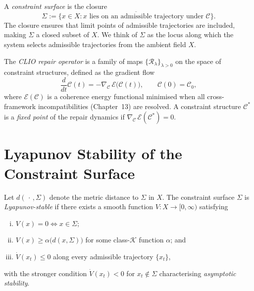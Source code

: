 \documentclass[11pt,openany]{book}
\begin{document}
\begin{definition}
\label{def:constraint-surface}
A \emph{constraint surface} is the closure
\[
  \Sigma := \overline{\bigl\{x \in X : x \text{ lies on an
    admissible trajectory under } \mathcal{C}\bigr\}}.
\]
The closure ensures that limit points of admissible
trajectories are included, making $\Sigma$ a closed subset
of $X$.  We think of $\Sigma$ as the locus along which the
system selects admissible trajectories from the ambient
field $X$.
\end{definition}

\begin{definition}
\label{def:clio}
The \emph{CLIO repair operator} is a family of maps
$\{\mathcal{R}_\lambda\}_{\lambda > 0}$ on the space of
constraint structures, defined as the gradient flow
\[
  \frac{d}{dt}\mathcal{C}(t)
    = -\nabla_{\mathcal{C}} \,\mathcal{E}\bigl(\mathcal{C}(t)\bigr),
  \qquad \mathcal{C}(0) = \mathcal{C}_0,
\]
where $\mathcal{E}(\mathcal{C})$ is a coherence energy
functional minimised when all cross-framework
incompatibilities (Chapter~13) are resolved.  A constraint
structure $\mathcal{C}^*$ is a \emph{fixed point} of the
repair dynamics if $\nabla_{\mathcal{C}}\,
\mathcal{E}(\mathcal{C}^*) = 0$.
\end{definition}

\section{Lyapunov Stability of the Constraint Surface}
\label{sec:lyapunov}

\begin{definition}
\label{def:lyapunov-stability}
Let $d(\,\cdot\,,\Sigma)$ denote the metric distance to
$\Sigma$ in $X$.  The constraint surface $\Sigma$ is
\emph{Lyapunov-stable} if there exists a smooth function
$V : X \to [0,\infty)$ satisfying
\begin{enumerate}[(i)]
  \item $V(x) = 0 \iff x \in \Sigma$;
  \item $V(x) \ge \alpha\bigl(d(x,\Sigma)\bigr)$ for some
    class-$\mathcal{K}$ function $\alpha$; and
  \item $\dot{V}(x_t) \le 0$ along every admissible
    trajectory $\{x_t\}$,
\end{enumerate}
with the stronger condition $\dot{V}(x_t) < 0$ for
$x_t \notin \Sigma$ characterising \emph{asymptotic stability}.
\end{definition}
\end{document}

